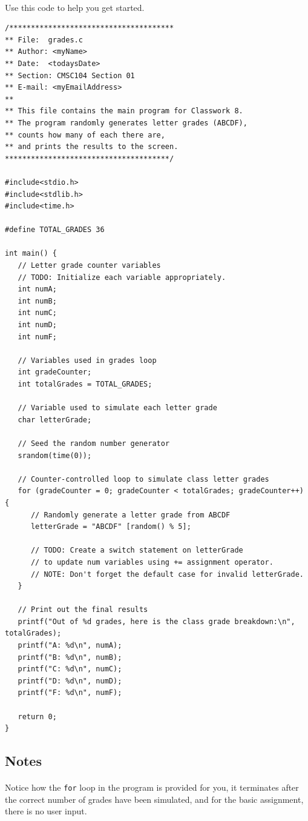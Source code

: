 \documentclass[letter,11pt]{article}
\begin{document}
\paragraph{}Use this code to help you get started.
\begin{verbatim}
/**************************************
** File:  grades.c
** Author: <myName>
** Date:  <todaysDate>
** Section: CMSC104 Section 01
** E-mail: <myEmailAddress>
**
** This file contains the main program for Classwork 8.
** The program randomly generates letter grades (ABCDF),
** counts how many of each there are,
** and prints the results to the screen.
**************************************/

#include<stdio.h>
#include<stdlib.h>
#include<time.h>

#define TOTAL_GRADES 36

int main() {
   // Letter grade counter variables
   // TODO: Initialize each variable appropriately.
   int numA;
   int numB;
   int numC;
   int numD;
   int numF;

   // Variables used in grades loop
   int gradeCounter;
   int totalGrades = TOTAL_GRADES;

   // Variable used to simulate each letter grade
   char letterGrade;

   // Seed the random number generator
   srandom(time(0));

   // Counter-controlled loop to simulate class letter grades
   for (gradeCounter = 0; gradeCounter < totalGrades; gradeCounter++) {
      // Randomly generate a letter grade from ABCDF
      letterGrade = "ABCDF" [random() % 5];

      // TODO: Create a switch statement on letterGrade
      // to update num variables using += assignment operator.
      // NOTE: Don't forget the default case for invalid letterGrade.
   }

   // Print out the final results
   printf("Out of %d grades, here is the class grade breakdown:\n", totalGrades);
   printf("A: %d\n", numA);
   printf("B: %d\n", numB);
   printf("C: %d\n", numC);
   printf("D: %d\n", numD);
   printf("F: %d\n", numF);

   return 0;
}

\end{verbatim}

\subsection*{Notes}
\paragraph{}Notice how the \texttt{for} loop in the program is provided for you, it terminates after the correct number of grades have been simulated, and for the basic assignment, there is no user input.
\end{document}
